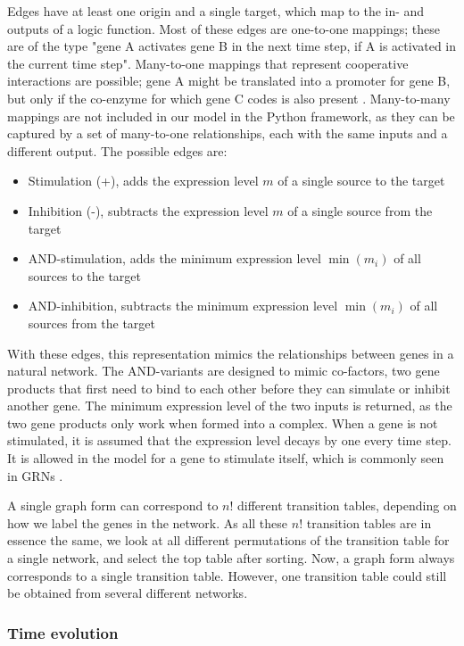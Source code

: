 \documentclass[../main.tex]{subfiles}
\begin{document}
Edges have at least one origin and a single target, which map to the in- and outputs of a logic function.
Most of these edges are one-to-one mappings; these are of the type "gene A activates gene B in the next time step, if A is activated in the current time step".
Many-to-one mappings that represent cooperative interactions are possible; gene A might be translated into a promoter for gene B, but only if the co-enzyme for which gene C codes is also present \cite{bolouri2002modeling, de2002modeling}.
Many-to-many mappings are not included in our model in the Python framework, as they can be captured by a set of many-to-one relationships, each with the same inputs and a different output.
The possible edges are:
%
\begin{itemize}
\item Stimulation (+), adds the expression level $m$ of a single source to the target
\item Inhibition (-), subtracts the expression level $m$ of a single source from the target
\item AND-stimulation, adds the minimum expression level $\min(m_i)$ of all sources to the target
\item AND-inhibition, subtracts the minimum expression level $\min(m_i)$ of all sources from the target
\end{itemize}
%
With these edges, this representation mimics the relationships between genes in a natural network.
The AND-variants are designed to mimic co-factors, two gene products that first need to bind to each other before they can simulate or inhibit another gene.
The minimum expression level of the two inputs is returned, as the two gene products only work when formed into a complex.
When a gene is not stimulated, it is assumed that the expression level decays by one every time step.
It is allowed in the model for a gene to stimulate itself, which is commonly seen in GRNs \cite{thomas1995dynamical, zhou2016relative}.

A single graph form can correspond to $n!$ different transition tables, depending on how we label the genes in the network.
As all these $n!$ transition tables are in essence the same, we look at all different permutations of the transition table for a single network, and select the top table after sorting.
Now, a graph form always corresponds to a single transition table.
However, one transition table could still be obtained from several different networks.

\subsubsection{Time evolution}
\end{document}
